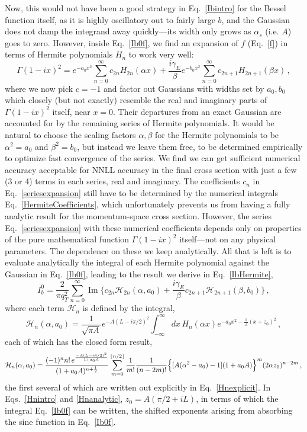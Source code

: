 \documentclass[a4,letterpaper,11pt]{article}
\newcommand{\be}{\begin{equation}}
\newcommand{\ee}{\end{equation}}
\newcommand{\as}{\alpha_s}
\newcommand{\cH}{\mathcal{H}}
\newcommand{\eq}[1]{Eq.~\eqref{#1}}
\newcommand{\eqs}[2]{Eqs.~\eqref{#1} and \eqref{#2}}
\DeclareMathOperator{\Imag}{Im}
\DeclarePairedDelimiter\floor{\lfloor}{\rfloor}
\begin{document}
Now, this would not have been a good strategy in \eq{Ibintro} for the Bessel function itself, as it is highly oscillatory out to fairly large $b$, and the Gaussian does not damp the integrand away quickly---its width only grows as $\as$ (i.e. $A$) goes to zero. However, inside \eq{Ib0f}, we find an expansion of $f$ (\eq{f}) in terms of Hermite polynomials $H_n$ to work very well:
\be
\label{seriesexpansion}
\Gamma(1-ix)^2  =  e^{-a_0 x^2} \sum_{n=0}^\infty c_{2n} H_{2n}(\alpha x) 
	+ \frac{i \gamma_E}{\beta} e^{-b_0 x^2} \sum_{n=0}^\infty c_{2n+1} H_{2n+1}(\beta x) \,,
\ee
where we now pick $c=-1$ and factor out Gaussians with widths set by $a_0,b_0$ which closely (but not exactly) resemble the real and imaginary parts of $\Gamma(1-ix)^2$ itself, near $x=0$. Their departures from an exact Gaussian are accounted for by the remaining series of Hermite polynomials. It would be natural to choose the scaling factors $\alpha,\beta$ for the Hermite polynomials to be $\alpha^2 = a_0$ and $\beta^2 = b_0$, but instead we leave them free, to be determined empirically to optimize fast convergence of the series. We find we can get sufficient numerical accuracy acceptable for NNLL accuracy in the final cross section with just a few (3 or 4) terms in each series, real and imaginary. The coefficients $c_n$ in \eq{seriesexpansion} still have to be determined by the numerical integrals \eq{HermiteCoefficients}, which unfortunately prevents us from having a fully analytic result for the momentum-space cross section. However, the series \eq{seriesexpansion} with these numerical coefficients depends only on properties of the pure mathematical function $\Gamma(1-ix)^2$ itself---not on any physical parameters. The dependence on these we keep analytically. All that is left is to evaluate analytically the integral of each Hermite polynomial against the Gaussian in \eq{Ib0f}, leading to the result we derive in \eq{IbHermite},
\be
\label{Ibseriesintro}
I_b^0  = \frac{2}{\pi q_T^2}  \sum_{n=0}^{\infty} 
\Imag \biggl\{    c_{2n} \cH_{2n}(\alpha,a_0) + \frac{i\gamma_E}{\beta} c_{2n+1} \cH_{2n+1}(\beta,b_0)  \biggr\}\,,
\ee
where each term $\cH_{n}$ is defined by the integral,
\be
\label{Hnintro}
\cH_{n}(\alpha,a_0) =  \frac{1}{\sqrt{\pi A}} e^{-A(L-i\pi/2)^2}\int_{-\infty}^\infty dx\, H_{n}(\alpha x) e^{-a_0 x^2-\frac{1}{A}( x + z_0)^2}\,,
\ee
each of which has the closed form result,
\be
\label{Hnanalytic}
\cH_n(\alpha,a_0) =  \frac{(-1)^n n! \, e^{\frac{-A(L-i\pi/2)^2}{1+a_0 A}}}{(1+a_0 A)^{n+\frac{1}{2}}}\sum_{m=0}^{\floor*{n/2}}\frac{1}{m!}\frac{1}{(n-2m)!} \Bigl\{ [ A(\alpha^2 - a_0)-1] (1+a_0 A)\Bigr\}^m (2\alpha z_0)^{n-2m} \,,
\ee
the first several of which are written out explicitly in \eq{Hnexplicit}. In \eqs{Hnintro}{Hnanalytic}, $z_0 = A(\pi/2 + iL)$, in terms of which the integral \eq{Ib0f} can be written, the shifted exponents arising from absorbing the sine function in \eq{Ib0f}. 
\end{document}
